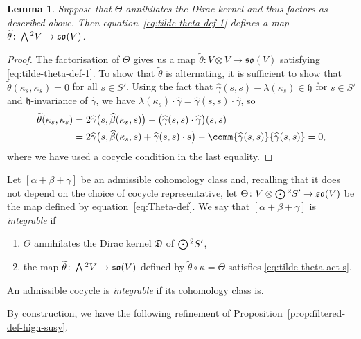 \documentclass[pdftex]{sigma}
\numberwithin{equation}{section}
\newtheorem{Lemma}[Theorem]{Lemma}
\newcommand{\fh}{\mathfrak{h}}
\newcommand{\fso}{\mathfrak{so}}
\newcommand{\fD}{\mathfrak{D}}
\newcommand{\betahat}{\widehat{\beta}}
\newcommand{\gammahat}{\widehat{\gamma}}
\newcommand{\thetatilde}{\widetilde{\theta}}
\newcommand{\Wedge}{\mathchoice{{\textstyle\bigwedge}}{\bigwedge}{\bigwedge}{\bigwedge}}	%
\newcommand{\Odot}{\mathchoice{{\textstyle\bigodot}}{\bigodot}{\bigodot}{\bigodot}}
\newcommand{\1}{\mathbbm{1}}
\begin{document}
\begin{Lemma}\label{lemma:theta-well-def}
	Suppose that $\Theta$ annihilates the Dirac kernel and thus factors as described above. Then equation~\eqref{eq:tilde-theta-def-1} defines a map $\thetatilde\colon\Wedge^2V\to \fso(V)$.
\end{Lemma}

\begin{proof}
	The factorisation of $\Theta$ gives us a map $\thetatilde\colon V\otimes V \to \fso(V)$ satisfying \eqref{eq:tilde-theta-def-1}. To show that $\thetatilde$ is alternating, it is sufficient to show that $\thetatilde(\kappa_s,\kappa_s)=0$ for all $s\in S'$. Using the fact that $\gammahat(s,s)-\lambda(\kappa_s)\in\fh$ for $s\in S'$ and $\fh$-invariance of $\gammahat$, we have $\lambda(\kappa_s)\cdot\gammahat = \gammahat(s,s)\cdot\gammahat$, so
	\begin{align*}
		\thetatilde(\kappa_s,\kappa_s)
		&= 2\gammahat\bigl(s,\betahat(\kappa_s,s)\bigr) - \bigl(\gammahat(s,s)\cdot\gammahat\bigr)(s,s)\\
		& = 2\gammahat\bigl(s,\betahat(\kappa_s,s) + \gammahat(s,s)\cdot s\bigr) - \comm{\gammahat(s,s)}{\gammahat(s,s)}
		= 0,
	\end{align*}
	where we have used a cocycle condition in the last equality.
\end{proof}

\begin{Definition}\label{def:integrable-cocycle}
	Let $[\alpha+\beta+\gamma]$ be an admissible cohomology class and, recalling that it does not depend on the choice of cocycle representative, let $\Theta\colon V\otimes\Odot^2S'\to\fso(V) $ be the map defined by equation~\eqref{eq:Theta-def}. We say that $[\alpha+\beta+\gamma]$ is \emph{integrable} if
	\begin{enumerate}\itemsep=0pt
	\item $\Theta$ annihilates the Dirac kernel $\fD$ of $\Odot^2S'$,
	\item the map $\thetatilde\colon\Wedge^2 V\to \fso(V)$ defined by $\thetatilde\circ\kappa=\Theta$ satisfies	\eqref{eq:tilde-theta-act-s}.
	\end{enumerate}
	An admissible cocycle is \emph{integrable} if its cohomology class is.
\end{Definition}

By construction, we have the following refinement of Proposition~\ref{prop:filtered-def-high-susy}.
\end{document}
